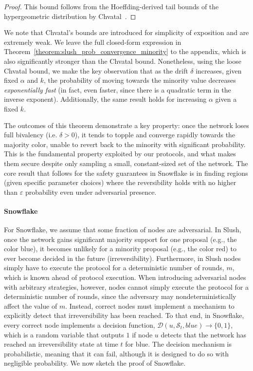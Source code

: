 \documentclass[letterpaper,twocolumn,10pt]{article}
\theoremstyle{definition}
\begin{document}
\begin{proof}
This bound follows from the Hoeffding-derived tail bounds of the hypergeometric distribution by Chvatal~\cite{chvatal1979tail}. 
\end{proof}

We note that Chvatal's bounds are introduced for simplicity of exposition and are extremely weak.  
We leave the full closed-form expression in Theorem~\ref{theorem:slush_prob_convergence_minority} to the appendix, which is also significantly stronger than the Chvatal bound. 
Nonetheless, using the loose Chvatal bound, we make the key observation that as the drift $\delta$ increases, given fixed $\alpha$ and $k$, the probability of moving towards the minority value decreases \emph{exponentially fast} (in fact, even faster, since there is a quadratic term in the inverse exponent). Additionally, the same result holds for increasing $\alpha$ given a fixed $k$. 

The outcomes of this theorem demonstrate a key property: once the network loses full bivalency (i.e. $\delta > 0$), it tends to topple and converge rapidly towards the majority color, unable to revert back to the minority with significant probability. This is the fundamental property exploited by our protocols, and what makes them secure despite only sampling a small, constant-sized set of the network. The core result that follows for the safety guarantees in Snowflake is in finding regions (given specific parameter choices) where the reversibility holds with no higher than $\varepsilon$ probability even under adversarial presence. 

\paragraph{Snowflake} 
For Snowflake, we assume that some fraction of nodes are adversarial. In Slush, once the network gains significant majority support for one proposal (e.g., the color blue), it becomes unlikely for a minority proposal (e.g., the color red) to ever become decided in the future (irreversibility). Furthermore, in Slush nodes simply have to execute the protocol for a deterministic number of rounds, $m$, which is known ahead of protocol execution. When introducing adversarial nodes with arbitrary strategies, however, nodes cannot simply execute the protocol for a deterministic number of rounds, since the adversary may nondeterministically affect the value of $m$. Instead, correct nodes must implement a mechanism to explicitly detect that irreversibility has been reached. To that end, in Snowflake, every correct node implements a decision function, $\mathcal{D}(u, \mathcal{S}_t, blue) \rightarrow \{0, 1\}$, which is a random variable that outputs $1$ if node $u$ detects that the network has reached an irreversibility state at time $t$ for blue. The decision mechanism is probabilistic, meaning that it can fail, although it is designed to do so with negligible probability. We now sketch the proof of Snowflake.
\end{document}
